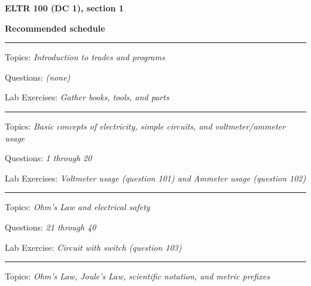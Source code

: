 
\centerline{\bf ELTR 100 (DC 1), section 1} \bigskip 
 
\vskip 10pt

\noindent
{\bf Recommended schedule}

\vskip 5pt

\hrule \vskip 5pt
\noindent
{}

\hskip 10pt Topics: {\it Introduction to trades and programs}
 
\hskip 10pt Questions: {\it (none)}
 
\hskip 10pt Lab Exercises: {\it Gather books, tools, and parts}

\vskip 10pt
\hrule \vskip 5pt
\noindent
{}

\hskip 10pt Topics: {\it Basic concepts of electricity, simple circuits, and voltmeter/ammeter usage}
 
\hskip 10pt Questions: {\it 1 through 20}
 
\hskip 10pt Lab Exercises: {\it Voltmeter usage (question 101) and Ammeter usage (question 102)}
 



\vskip 10pt
\hrule \vskip 5pt
\noindent
{}

\hskip 10pt Topics: {\it Ohm's Law and electrical safety}
 
\hskip 10pt Questions: {\it 21 through 40}
 
\hskip 10pt Lab Exercise: {\it Circuit with switch (question 103)}
 



\vskip 10pt
\hrule \vskip 5pt
\noindent
{}

\hskip 10pt Topics: {\it Ohm's Law, Joule's Law, scientific notation, and metric prefixes}
 
